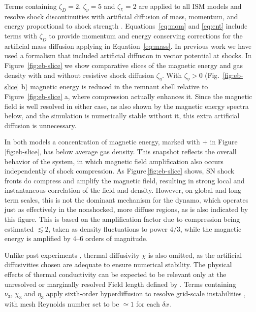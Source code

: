 \documentclass[preprint2]{aastex63}
\newcommand\dx{ {\delta x}}
\begin{document}
 Terms containing $\zeta_D{=2},\,\zeta_\nu=5$ and $\zeta{_\chi=2}$
 {are applied to all ISM models and} resolve shock discontinuities with
 artificial diffusion of mass, momentum, and energy proportional to shock
 strength \citep[see][for details]{GMKSH20}.
 {Equations~\eqref{eq:mom} and \eqref{eq:ent} include terms with $\zeta_D$}
 {to} {provide momentum and energy conserving corrections for} {the}
 {artificial mass diffusion applying in Equation~\eqref{eq:mass}.}
 {In previous work \citet{Gent:2013b} we have used a formalism that
 included artificial diffusion in vector potential at shocks.
 In Figure~\ref{fig:eb-slice} we show comparative slices of the magnetic
 energy and gas density with and without resistive shock diffusion
 $\zeta_\eta$.
 With $\zeta_\eta>0$ (Fig.~\ref{fig:eb-slice} b) magnetic energy is reduced in the remnant shell relative to Figure~\ref{fig:eb-slice} a, where compression actually enhances it.}
 Since the magnetic field is well resolved in either case, as also
 shown by the magnetic energy spectra below, and the simulation is
 numerically stable without it, this extra artificial
 diffusion is unnecessary.

 In both models a concentration of magnetic energy, marked with $+$ in
 Figure\,\ref{fig:eb-slice}, has below average gas density.
 {This snapshot reflects the overall behavior of the system, in which
 magnetic field amplification also occurs independently of shock compression.
 As Figure\,\ref{fig:eb-slice} shows, SN shock fronts do compress and amplify
 the magnetic field, resulting in strong local and instantaneous correlation
 of the field and density.
 However, on global and long-term scales, this is not the dominant mechanism
 for the dynamo, which operates just as effectively in the nonshocked, more
 diffuse regions, as is also indicated by this figure.
 This is based on the amplification factor due to compression being estimated
 $\lesssim2$, taken as density fluctuations to power $4/3$, while the magnetic
 energy is amplified by 4--6 orders of magnitude.}

  {Unlike past} experiments \citep{Gent:2013b,Gent:2013a,GMKSH20},
 thermal diffusivity $\chi$ is {also} omitted, as the artificial diffusivities
 {chosen} are adequate to ensure numerical stability.
 {The} physical effects of thermal conductivity can be expected to be
 relevant only at the unresolved or marginally resolved Field length defined
 by \citet[][named after George Field, not the magnetic field]{BM90}.
 Terms containing $\nu_3,\,\chi_3$ and $\eta_3$ apply sixth-order hyperdiffusion
 to resolve grid-scale instabilities \citep[see, e.g.,][]{ABGS02,HB04}, {
 with mesh Reynolds number set to be $\simeq1$ for each $\dx$}.
\end{document}
